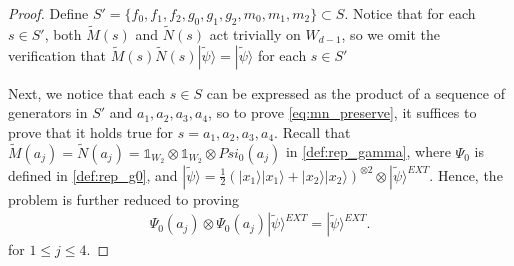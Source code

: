 \documentclass[11pt,letterpaper]{article}
\newcommand{\ket}[1]{|#1\rangle}
\newcommand{\x}{\otimes}
\newcommand{\1}{\mathbb{1}}
\newcommand{\EXT}{EXT}
\newcommand{\tM}{\tilde{M}}
\newcommand{\tN}{\tilde{N}}
\newcommand{\tpsi}{\tilde{\psi}}
\theoremstyle{definition}
\begin{document}
\begin{proof}
    Define $S' = \{f_0, f_1, f_2, g_0, g_1, g_2, m_0, m_1, m_2\} \subset S$. Notice that for each $s \in S'$, both $\tM(s)$ and $\tN(s)$ act
    trivially on $W_{d-1}$, so we omit the verification that 
    $\tM(s)\tN(s) \ket{\tpsi} = \ket{\tpsi}$ for each $s \in S'$
	
	Next, we notice that each $s \in S$ can be expressed as the 
	product of a sequence of generators in $S'$ and $a_1, a_2, a_3, a_4$, so
	to prove \cref{eq:mn_preserve}, it suffices to prove that it 
	holds true for $s = a_1, a_2, a_3, a_4$. 
	Recall that $\tM(a_j) = \tN(a_j) = \1_{W_2} \x \1_{W_2} \x Psi_0(a_j)$
	in \cref{def:rep_gamma},
	where $\Psi_0$ is defined in \cref{def:rep_g0},
	and $\ket{\tpsi} = \frac{1}{2} (\ket{x_1}\ket{x_1}+\ket{x_2}\ket{x_2})^{\x 2} \x \ket{\tpsi}^{\EXT}$.
	Hence, the problem is further reduced to proving
	\begin{align*}
	    \Psi_0(a_j) \x \Psi_0(a_j) \ket{\tpsi}^{\EXT} = \ket{\tpsi}^{\EXT}.
	\end{align*}
	for $1 \leq j \leq 4$.
	

\end{proof}
\end{document}
